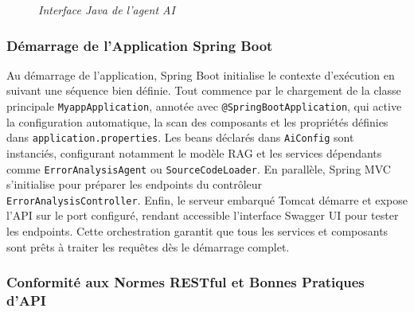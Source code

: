 \documentclass[12pt,a4paper]{report}
\begin{document}
		\begin{figure}[H]
		\centering
		\caption{\textit{Interface Java de l'agent AI}}
		\label{fig:ai-agent}
	\end{figure}
	
	\subsubsection{Démarrage de l'Application Spring Boot}
	
	Au démarrage de l'application, Spring Boot initialise le contexte d'exécution en suivant une séquence bien définie. Tout commence par le chargement de la classe principale \verb|MyappApplication|, annotée avec \verb|@SpringBootApplication|, qui active la configuration automatique, la scan des composants et les propriétés définies dans \verb|application.properties|. Les beans déclarés dans \verb|AiConfig| sont instanciés, configurant notamment le modèle RAG et les services dépendants comme \verb|ErrorAnalysisAgent| ou \verb|SourceCodeLoader|. En parallèle, Spring MVC s'initialise pour préparer les endpoints du contrôleur \\ \verb|ErrorAnalysisController|. Enfin, le serveur embarqué Tomcat démarre et expose l'API sur le port configuré, rendant accessible l'interface Swagger UI pour tester les endpoints. Cette orchestration garantit que tous les services et composants sont prêts à traiter les requêtes dès le démarrage complet.
	
	\subsubsection{Conformité aux Normes RESTful et Bonnes Pratiques d'API}
	
\end{document}
